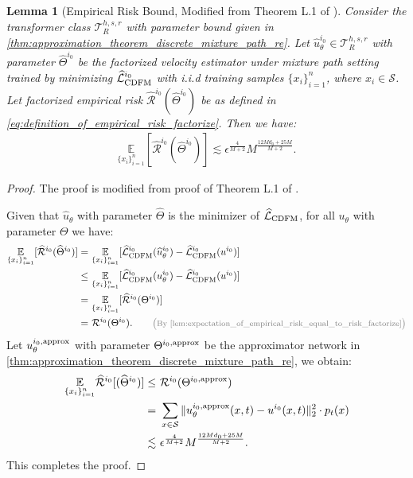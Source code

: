 \documentclass[12pt]{article}
\numberwithin{equation}{section}
\let\hat\widehat
\newcommand{\wh}{\widehat}
\renewcommand{\hat}{\wh}
\DeclareMathOperator*{\E}{{\mathbb{E}}}
\def\E{\mathbb{E}}
\let\cite\citep
\theoremstyle{theoremstyle}
\newtheorem{lemma}{Lemma}[section]
\numberwithin{equation}{section}
\numberwithin{theorem}{section}
\numberwithin{proposition}{section}
\numberwithin{definition}{section}
\numberwithin{lemma}{section}
\numberwithin{assumption}{section}
\numberwithin{remark}{section}
\newcommand*{\annot}[1]{\tag*{\footnotesize{\textcolor{black!50}{\big(#1\big)}}}}
\begin{document}
\begin{lemma}[Empirical Risk Bound, Modified from Theorem L.1 of \cite{su2025high}]\label{lem:empirical_risk_bound_of_trained_network_mixture_path}
Consider the transformer class $\mathcal{T}^{h,s,r}_R$ with parameter bound given in \cref{thm:approximation_theorem_discrete_mixture_path_re}.
Let $\hat{u}^{i_0}_\theta\in\mathcal{T}^{h,s,r}_R$ with parameter $\hat{\Theta}^{i_0}$ be the factorized velocity estimator under mixture path setting trained by minimizing $\hat{\mathcal{L}}^{i_0}_{\rm CDFM}$ with i.i.d training samples $\{x_i\}_{i=1}^n$, where $x_i\in \mathcal{S}$.
Let factorized empirical risk $\hat{\mathcal{R}}^{i_0}(\hat{\Theta}^{i_0})$ be as defined in \eqref{eq:definition_of_empirical_risk_factorize}.
Then we have:
\begin{align*}
    \underset{\{x_i\}_{i=1}^n}{\E}[\hat{\mathcal{R}}^{i_0}(\hat{\Theta}^{i_0})]\lesssim   \epsilon^\frac{4}{M+2}M^{\frac{12Md_0+25M}{M+2}}.
\end{align*}
\end{lemma}

\begin{proof}
The proof is modified from proof of Theorem L.1 of \cite{su2025high}.

Given that $\hat{u}_\theta$ with parameter $\hat{\Theta}$ is the minimizer of $\hat{\mathcal{L}}_{\rm CDFM}$, for all $u_\theta$ with parameter $\Theta$ we have:
\begin{align*}
    \underset{\{x_i\}_{i=1}^n}{\E}[\hat{\mathcal{R}}^{i_0}(\hat{\Theta}^{i_0})] = & ~
    \underset{\{x_i\}_{i=1}^n}{\E}[\hat{\mathcal{L}}^{i_0}_{\rm CDFM}(\hat{u}^{i_0}_\theta)-\hat{\mathcal{L}}^{i_0}_{\rm CDFM}(u^{i_0})]          \\
    \leq & ~
    \underset{\{x_i\}_{i=1}^n}{\E}[\hat{\mathcal{L}}^{i_0}_{\rm CDFM}(u^{i_0}_\theta)-\hat{\mathcal{L}}^{i_0}_{\rm CDFM}(u^{i_0})]\\
    = & ~
    \underset{\{x_i\}_{i=1}^n}{\E} [\hat{\mathcal{R}}^{i_0}(\Theta^{i_0})] \\
    = & ~
    \mathcal{R}^{i_0}(\Theta^{i_0}).           \annot{By \cref{lem:expectation_of_empirical_risk_equal_to_risk_factorize}}
\end{align*}
Let $u_\theta^{i_0,\rm approx}$ with parameter $\Theta^{i_0,\rm approx}$ be the approximator network in \cref{thm:approximation_theorem_discrete_mixture_path_re}, we obtain:
\begin{align*}
    \underset{\{x_i\}_{i=1}^n}{\E}\hat{\mathcal{R}}^{i_0}[(\hat{\Theta}^{i_0})] \leq & ~
    \mathcal{R}^{i_0}(\Theta^{i_0,\rm approx}) \\
    = & ~
    \sum_{x\in \mathcal{S}}\|u_\theta^{i_0,\rm approx}(x,t)-u^{i_0}(x,t)\|^2_2\cdot p_t(x) \\
    \lesssim & ~  
    \epsilon^\frac{4}{M+2}M^{\frac{12Md_0+25M}{M+2}}.
\end{align*}
This completes the proof.
\end{proof}
\end{document}
